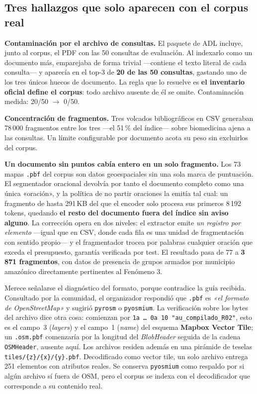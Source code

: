 \documentclass[10pt,a4paper]{article}
\begin{document}
\subsection{Tres hallazgos que solo aparecen con el corpus real}

\textbf{Contaminación por el archivo de consultas.} El paquete de ADL incluye, junto al corpus, el
PDF con las 50 consultas de evaluación. Al indexarlo como un documento más, emparejaba de forma
trivial —contiene el texto literal de cada consulta— y aparecía en el top-3 de \textbf{20 de las 50
consultas}, gastando uno de los tres únicos huecos de documento. La regla que lo resuelve es
\textbf{el inventario oficial define el corpus}: todo archivo ausente de él se omite. Contaminación
medida: 20/50 $\rightarrow$ 0/50.

\textbf{Concentración de fragmentos.} Tres volcados bibliográficos en CSV generaban 78\,000
fragmentos entre los tres —el 51\,\% del índice— sobre biomedicina ajena a las consultas. Un
límite configurable por documento acota su peso sin excluirlos del corpus.

\textbf{Un documento sin puntos cabía entero en un solo fragmento.} Los 73 mapas \texttt{.pbf} del
corpus son datos geoespaciales sin una sola marca de puntuación. El segmentador oracional devolvía
por tanto el documento completo como una única «oración», y la política de no partir oraciones la
emitía tal cual: un fragmento de hasta 291\,KB del que el encoder solo procesa sus primeros 8\,192
tokens, quedando \textbf{el resto del documento fuera del índice sin aviso alguno}. La corrección
opera en dos niveles: el extractor emite \emph{un registro por elemento} —igual que en CSV, donde
cada fila es una unidad de fragmentación con sentido propio— y el fragmentador trocea por palabras
cualquier oración que exceda el presupuesto, garantía verificada por test. El resultado pasa de 77
a \textbf{3\,871 fragmentos}, con datos de presencia de grupos armados por municipio amazónico
directamente pertinentes al Fenómeno 3.

Merece señalarse el diagnóstico del formato, porque contradice la guía recibida. Consultado por la
comunidad, el organizador respondió que \texttt{.pbf} es \emph{«el formato de OpenStreetMap»} y
sugirió \texttt{pyrosm} o \texttt{pyosmium}. La verificación sobre los bytes del archivo dice otra
cosa: comienzan por \texttt{1a\,\ldots\,0a\,10\,"au\_compilado\_R02"}, esto es el campo~3
(\emph{layers}) y el campo~1 (\emph{name}) del esquema \textbf{Mapbox Vector Tile}; un
\texttt{.osm.pbf} comenzaría por la longitud del \emph{BlobHeader} seguida de la cadena
\texttt{OSMHeader}, ausente aquí. Los archivos residen además en una pirámide de teselas
\texttt{tiles/\{z\}/\{x\}/\{y\}.pbf}. Decodificado como vector tile, un solo archivo entrega 251
elementos con atributos reales. Se conserva \texttt{pyosmium} como respaldo por si algún archivo sí
fuera de OSM, pero el corpus se indexa con el decodificador que corresponde a su contenido real.
\end{document}
